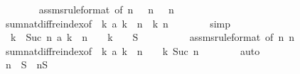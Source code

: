 \begin{isabellebody}
\ \ \ \ \ \ \isamarkupfalse%
\ assms{\isacharparenleft}{}{\isacharparenright}{\isacharbrackleft}rule{\isacharunderscore}format{\isacharcomma}\ of\ {\isachardoublequoteopen}n\ {\isacharminus}\ {}{\isachardoublequoteclose}{\isacharbrackright}\ {\isacharbackquoteopen}n\ {\isachargreater}\ {}{\isacharbackquoteclose}\ {\isacharbackquoteopen}n\ {\isacharminus}\ {}\ {\isasymge}\ {}{\isacharbackquoteclose}\ \isanewline
\ \ \ \ \ \ \isamarkupfalse%
\ sum{\isachardot}nat{\isacharunderscore}diff{\isacharunderscore}reindex{\isacharbrackleft}of\ {\isachardoublequoteopen}{\isasymlambda}\ k{\isachardot}\ a\ k\ {\isacharslash}\ {\isacharparenleft}n\ {\isacharminus}\ k{\isacharparenright}{\isachardoublequoteclose}\ {\isachardoublequoteopen}n{\isachardoublequoteclose}{\isacharbrackright}\isanewline
\ \ \ \ \ \ \isamarkupfalse%
\ simp\isanewline
\isanewline
\ \ \ \ \isamarkupfalse%
\isanewline
\isanewline
\ \ \ \ \isamarkupfalse%
\ {\isachardoublequoteopen}{\isacharparenleft}{\isasymSum}\ k\ {\isacharless}\ Suc\ n{\isachardot}\ a\ k\ {\isacharslash}\ {\isacharparenleft}n\ {\isacharplus}\ {}\ {\isacharminus}\ k{\isacharparenright}{\isacharparenright}\ {\isacharequal}\ {}{\isachardoublequoteclose}\ {\isacharparenleft}\ {\isachardoublequoteopen}{\isacharquery}S{}\ {\isacharequal}\ {}{\isachardoublequoteclose}{\isacharparenright}\isanewline
\ \ \ \ \ \ \isamarkupfalse%
\ assms{\isacharparenleft}{}{\isacharparenright}{\isacharbrackleft}rule{\isacharunderscore}format{\isacharcomma}\ of\ {\isachardoublequoteopen}n{\isachardoublequoteclose}{\isacharbrackright}\ {\isacharbackquoteopen}n\ {\isachargreater}\ {}{\isacharbackquoteclose}\isanewline
\ \ \ \ \ \ \isamarkupfalse%
\ sum{\isachardot}nat{\isacharunderscore}diff{\isacharunderscore}reindex{\isacharbrackleft}of\ {\isachardoublequoteopen}{\isasymlambda}\ k{\isachardot}\ a\ k\ {\isacharslash}\ {\isacharparenleft}n\ {\isacharplus}\ {}\ {\isacharminus}\ k{\isacharparenright}{\isachardoublequoteclose}\ {\isachardoublequoteopen}Suc\ n{\isachardoublequoteclose}{\isacharbrackright}\isanewline
\ \ \ \ \ \ \isamarkupfalse%
\ auto\isanewline
\isanewline
\ \ \ \ \isamarkupfalse%
\isanewline
\ \ \ \ \isamarkupfalse%
\ {\isachardoublequoteopen}{\isacharparenleft}n\ {\isacharplus}\ {}{\isacharparenright}{\isacharasterisk}{\isacharquery}S{}\ {\isacharminus}\ n{\isacharasterisk}{\isacharquery}S{}\ {\isacharequal}\ {}{\isachardoublequoteclose}\isanewline

\end{isabellebody}

